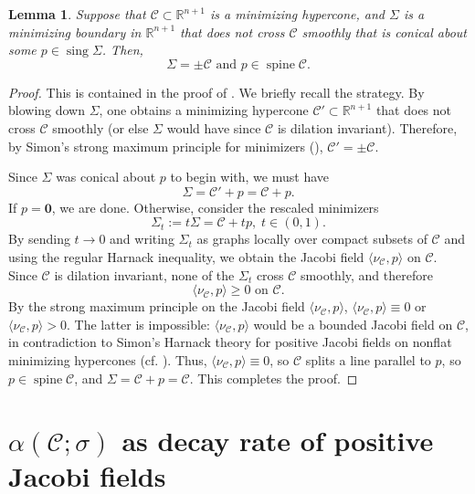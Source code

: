 \documentclass[11pt, letterpaper, reqno]{amsart}
\numberwithin{equation}{section}
\newtheorem{Lem}[Def]{Lemma}
\theoremstyle{remark}
\newcommand{\RR}{\mathbb{R}}
\newcommand{\cC}{\mathcal{C}}
\newcommand{\sing}{\operatorname{sing}}
\newcommand{\spine}{\operatorname{spine}}
\newcommand{\orig}{\mathbf{0}}
\begin{document}
\begin{Lem} \label{lemm:one.sided.cone}
	Suppose that $\cC \subset \RR^{n+1}$ is a minimizing hypercone, and $\Sigma$ is a minimizing boundary in $\RR^{n+1}$ that does not cross $\cC$ smoothly that is conical about some $p \in \sing \Sigma$. Then,
	\[ \Sigma = \pm \cC \text{ and } p \in \spine \cC. \]
\end{Lem}
\begin{proof}
	This is contained in the proof of  \cite[Proposition 3.3]{CMS:generic.9.10}. We briefly recall the strategy. By blowing down $\Sigma$, one obtains a minimizing hypercone $\cC' \subset \RR^{n+1}$ that does not cross $\cC$ smoothly (or else $\Sigma$ would have since $\cC$ is dilation invariant). Therefore, by Simon's strong maximum principle for minimizers (\cite{Simon:smp}), $\cC' = \pm \cC$. 
	
	Since $\Sigma$ was conical about $p$ to begin with, we must have
	\[ \Sigma = \cC' + p = \cC + p. \]
	If $p = \orig$, we are done. Otherwise, consider the rescaled minimizers
	\[ \Sigma_t := t \Sigma = \cC + tp, \; t \in (0, 1). \]
	By sending $t \to 0$ and writing $\Sigma_t$ as graphs locally over compact subsets of $\cC$ and using the regular Harnack inequality, we obtain the Jacobi field $\langle \nu_\cC, p \rangle$ on $\cC$. Since $\cC$ is dilation invariant, none of the $\Sigma_t$ cross $\cC$ smoothly, and therefore
	\[ \langle \nu_\cC, p \rangle \geq 0 \text{ on } \cC. \]
	By the strong maximum principle on the Jacobi field $\langle \nu_\cC, p \rangle$, $\langle \nu_\cC, p \rangle \equiv 0$ or $\langle \nu_\cC, p \rangle > 0$. The latter is impossible: $\langle \nu_\cC, p \rangle$ would be a bounded Jacobi field on $\cC$, in contradiction to Simon's Harnack theory for positive Jacobi fields on nonflat minimizing hypercones \cite{Simon:decay} (cf. \cite[Theorem 1.4]{Wang:smoothing}). Thus, $\langle \nu_\cC, p \rangle \equiv 0$, so $\cC$ splits a line parallel to $p$, so $p \in \spine \cC$, and $\Sigma = \cC + p = \cC$. This completes the proof.
\end{proof}


\section{$\alpha(\cC; \sigma)$ as decay rate of positive Jacobi fields}
\end{document}
